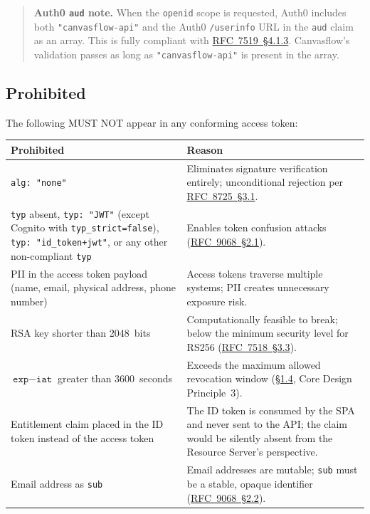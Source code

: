 \begin{quote}
  \textbf{Auth0 \texttt{aud} note.} When the \texttt{openid} scope is requested, Auth0
  includes both \linebreak \texttt{"canvasflow-api"} and the Auth0 \texttt{/userinfo} URL in the
  \texttt{aud} claim as an array. This is fully compliant with 
  \href{https://datatracker.ietf.org/doc/html/rfc7519\#section-4.1.3}{RFC~7519~\S4.1.3}.
  Canvasflow's validation passes as long as \texttt{"canvasflow-api"} is present in the
  array.
\end{quote}

\pagebreak

\subsection{Prohibited}\label{sec:prohibited}

The following MUST NOT appear in any conforming access token:





\begin{longtable}{@{}p{5.5cm}p{9cm}@{}}
\toprule
\textbf{Prohibited} & \textbf{Reason} \\
\midrule
\endhead
\texttt{alg: "none"} &
  Eliminates signature verification entirely; unconditional rejection per 
  \href{https://datatracker.ietf.org/doc/html/rfc8725\#section-3.1}{RFC~8725~\S3.1}. \\[6pt]
\texttt{typ} absent, \texttt{typ: "JWT"} (except Cognito with \texttt{typ\_strict=false}), \texttt{typ: "id\_token+jwt"}, or any other non-compliant \texttt{typ} &
  Enables token confusion attacks (\href{https://datatracker.ietf.org/doc/html/rfc9068\#section-2.1}{RFC~9068~\S2.1}). \\[6pt]
PII in the access token payload (name, email, physical address, phone number) &
  Access tokens traverse multiple systems; PII creates unnecessary exposure risk. \\[6pt]
RSA key shorter than 2048~bits &
  Computationally feasible to break; below the minimum security level for RS256
  (\href{https://datatracker.ietf.org/doc/html/rfc7518\#section-3.3}{RFC~7518~\S3.3}). \\[6pt]
$\texttt{exp} - \texttt{iat}$ greater than 3600~seconds &
  Exceeds the maximum allowed revocation window (\hyperref[sec:revocation]{\S1.4}, Core Design Principle~3). \\[6pt]
Entitlement claim placed in the ID token instead of the access token &
  The ID token is consumed by the SPA and never sent to the API; the claim would be
  silently absent from the Resource Server's perspective. \\[6pt]
Email address as \texttt{sub} &
  Email addresses are mutable; \texttt{sub} must be a stable, opaque identifier
  (\href{https://datatracker.ietf.org/doc/html/rfc9068\#section-2.2}{RFC~9068~\S2.2}). \\
\bottomrule
\end{longtable}

